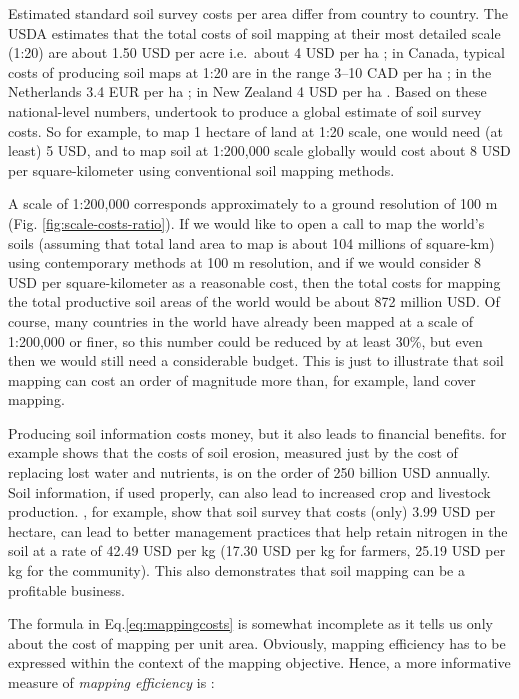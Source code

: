 \documentclass[graybox,natbib,nospthms,UStrade]{svmono}
\begin{document}
Estimated standard soil survey costs per area differ from country to
country. The USDA estimates that the total costs of soil mapping at
their most detailed scale (1:20) are about 1.50 USD per acre
i.e.~about 4 USD per ha \citep{eltit2008}; in Canada, typical costs of producing
soil maps at 1:20 are in the range 3--10 CAD per ha
\citep{MacMillan2010DSM}; in the Netherlands 3.4 EUR per ha
\citep[ pp.~149--154]{Kempen2011PhDthesis}; in New Zealand 4 USD per ha
\citep{Carrick2010WCSS}. Based on these national-level numbers, \citet{Hengl2013JAG}
undertook to produce a global estimate of soil survey costs. So for
example, to map 1 hectare of land at 1:20 scale, one would need (at
least) 5 USD, and to map soil at 1:200,000 scale globally would cost
about 8 USD per square-kilometer using conventional soil mapping
methods.

A scale of 1:200,000 corresponds approximately to a ground resolution of
100 m (Fig. \ref{fig:scale-costs-ratio}). If we would
like to open a call to map the world's soils (assuming that total land
area to map is about 104 millions of square-km) using contemporary methods at
100 m resolution, and if we would consider 8 USD per square-kilometer as
a reasonable cost, then the total costs for mapping the total productive
soil areas of the world would be about 872 million USD. Of course, many
countries in the world have already been mapped at a scale of 1:200,000 or
finer, so this number could be reduced by at least 30\%, but even then
we would still need a considerable budget. This is just to illustrate that soil
mapping can cost an order of magnitude more than, for example, land
cover mapping.

Producing soil information costs money, but it also leads to financial
benefits. \citet{Pimentel2006Springer} for example shows that the costs of soil
erosion, measured just by the cost of replacing lost water and
nutrients, is on the order of 250 billion USD annually. Soil
information, if used properly, can also lead to increased crop and
livestock production. \citet{Carrick2010WCSS}, for example, show that soil
survey that costs (only) 3.99 USD per hectare, can lead to better
management practices that help retain nitrogen in the soil at a rate of 42.49 USD
per kg (17.30 USD per kg for farmers, 25.19 USD per kg for the
community). This also demonstrates that soil mapping can be a profitable
business.

The formula in Eq.\eqref{eq:mappingcosts} is somewhat incomplete as it
tells us only about the cost of mapping per unit area. Obviously,
mapping efficiency has to be expressed within the context of the mapping
objective. Hence, a more informative measure of \emph{mapping efficiency} is
\citep{Hengl2013JAG}:
\end{document}
